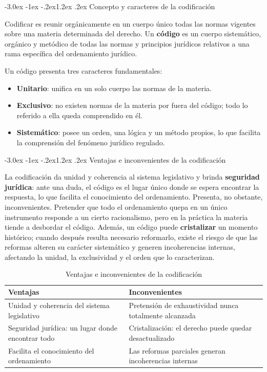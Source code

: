 \documentclass[12pt,oneside]{book}
\makeatletter
\renewcommand\section{\@startsection{section}{1}{\z@}%
  {-3.0ex \@plus -1ex \@minus -.2ex}{1.2ex \@plus .2ex}%
  {\normalfont\large\bfseries\color{acento}}}
\makeatother
\begin{document}
\section{Concepto y caracteres de la codificación}

\begin{definicion}[Codificación]
Codificar es reunir orgánicamente en un cuerpo único todas las normas vigentes sobre una materia determinada del derecho. Un \textbf{código} es un cuerpo sistemático, orgánico y metódico de todas las normas y principios jurídicos relativos a una rama específica del ordenamiento jurídico.
\end{definicion}

Un código presenta tres caracteres fundamentales:

\begin{itemize}
\item \textbf{Unitario}: unifica en un solo cuerpo las normas de la materia.
\item \textbf{Exclusivo}: no existen normas de la materia por fuera del código; todo lo referido a ella queda comprendido en él.
\item \textbf{Sistemático}: posee un orden, una lógica y un método propios, lo que facilita la comprensión del fenómeno jurídico regulado.
\end{itemize}

\section{Ventajas e inconvenientes de la codificación}

La codificación da unidad y coherencia al sistema legislativo y brinda \textbf{seguridad jurídica}: ante una duda, el código es el lugar único donde se espera encontrar la respuesta, lo que facilita el conocimiento del ordenamiento. Presenta, no obstante, inconvenientes. Pretender que todo el ordenamiento quepa en un único instrumento responde a un cierto racionalismo, pero en la práctica la materia tiende a desbordar el código. Además, un código puede \textbf{cristalizar} un momento histórico; cuando después resulta necesario reformarlo, existe el riesgo de que las reformas alteren su carácter sistemático y generen incoherencias internas, afectando la unidad, la exclusividad y el orden que lo caracterizan.

\begin{table}[H]
\centering
\begin{tabularx}{\textwidth}{YY}
\toprule
\textbf{Ventajas} & \textbf{Inconvenientes} \\
\midrule
Unidad y coherencia del sistema legislativo & Pretensión de exhaustividad nunca totalmente alcanzada \\
Seguridad jurídica: un lugar donde encontrar todo & Cristalización: el derecho puede quedar desactualizado \\
Facilita el conocimiento del ordenamiento & Las reformas parciales generan incoherencias internas \\
\bottomrule
\end{tabularx}
\caption{Ventajas e inconvenientes de la codificación}
\end{table}
\end{document}
